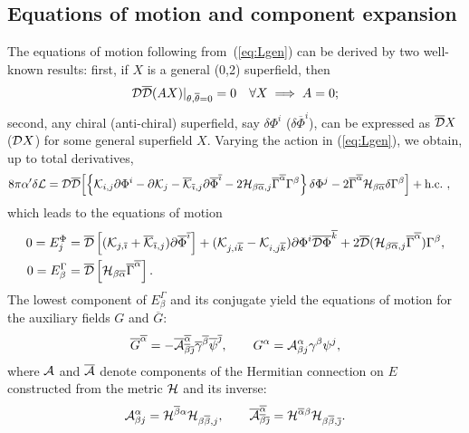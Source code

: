 \documentclass[11pt, a4paper]{article}
\def\cDb{{\overline{\cD}}}
\def\p{\partial}
\def\cA{{\cal A}}
\def\cD{{\cal D}}
\def\cH{{\cal H}}
\def\cK{{\cal K}}
\def\cL{{\cal L}}
\newcommand\alphab{\overline{\alpha}}
\newcommand\betab{\overline{\beta}}
\newcommand\gammab{\overline{\gamma}}
\newcommand\thetab{\overline{\theta}}
\newcommand\psib{\overline{\psi}}
\newcommand\Gammab{\overline{\Gamma}}
\newcommand\Phib{\overline{\Phi}}
\newcommand\ib{\overline{\imath}}
\newcommand\jb{\overline{\jmath}}
\newcommand\kb{\overline{k}}
\newcommand\Gb{\overline{G}}
\def\cAb{\overline{\cA}}
\def\cDb{\overline{\cD}}
\def\cKb{\overline{\cK}}
\begin{document}
\subsection{Equations of motion and component expansion}
The equations of motion following from~(\ref{eq:Lgen}) can be derived by two well-known results:  first, if $X$ is a general (0,2) superfield, then
$$\cD\cDb(A X) |_{\theta,\thetab =0} = 0 \quad \forall X \implies A = 0;$$
second, any chiral (anti-chiral) superfield, say $\delta\Phi^i$ ($\delta \Phib^i$), can be expressed as $\cDb X$ ($\cD X$) for some general superfield $X$.  Varying the action in (\ref{eq:Lgen}), we obtain, up to total derivatives,
\begin{align*}
8\pi \alpha' \delta\cL & = \cD \cDb \Bigl[
\left\{ \cK_{i,j} \p\Phi^i - \p \cK_j -\cKb_{\ib,j} \p\Phib^{\ib}
-2 \cH_{\beta\alphab,j} \Gammab^{\alphab} \Gamma^\beta \right\} \delta\Phi^j
-2 \Gammab^{\alphab} \cH_{\beta\alphab} \delta\Gamma^\beta \Bigr]
+\text{h.c.} ~,
\end{align*}
which leads to the equations of motion
\begin{align}
\label{eq:eomraw}
0 = E^\Phi_j & = \cDb \left[ (\cK_{j,\ib}+\cKb_{\ib,j}) \p \Phib^{\ib}\right] 
+(\cK_{j,i\kb} -\cK_{i,j\kb}) \p\Phi^i \cDb \Phib^{\kb}
 +2\cDb(\cH_{\beta\alphab,j} \Gammab^{\alphab}) \Gamma^\beta, \nonumber\\
0 = E^\Gamma_\beta & = \cDb \left[ \cH_{\beta\alphab} \Gammab^{\alphab} \right].
\end{align}
The lowest component of $E^\Gamma_\beta$  and its conjugate yield the
equations of motion for the auxiliary fields $G$ and $\Gb$:
\begin{align*}
\Gb^{\alphab}  = -\cAb^{\alphab}_{\betab\jb} \gammab^{\betab}\psib^{\jb}, \qquad
G^\alpha = \cA^\alpha_{\beta j} \gamma^\beta \psi^j,
\end{align*}
where $\cA$ and $\cAb$ denote components of the 
Hermitian connection on $E$ constructed from the metric $\cH$ and
its inverse:
\begin{align*}
\cA^{\alpha}_{\beta j} = \cH^{\betab\alpha} \cH_{\beta\betab,j}, \qquad
\cAb^{\alphab}_{\betab\jb} = \cH^{\alphab \beta} \cH_{\beta\betab,\jb}.
\end{align*}
\end{document}
